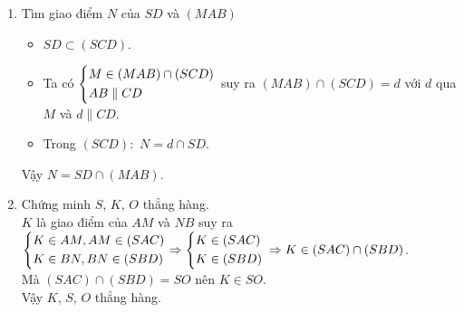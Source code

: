 \begin{bt}
{\begin{enumerate}
\begin{itemize}
					\item $S \in (SDG) \cap (SAB)$.
					\item $SG$ cắt $BC$ tại $E$ trong $(SBC)$ nên mặt phẳng $(SDG)$ cũng chính là mặt phẳng $(SDE)$.
					\item Trong $(ABCD)$ gọi $F= DE \cap AB$, suy ra
					$\heva{&F \in DE, DE \subset (SDG)\\&F \in AB, AB\subset (SAB)}
					\Rightarrow \heva{&F \in (SDG)\\&F \in (SAB)}\\
					\Rightarrow F \in (SDG) \cap (SAB)$.
				\end{itemize}
				Vậy $(SDG)\cap (SAB) =SF$.
			\item Tìm giao điểm $N$ của $SD$ và $(MAB)$
				\begin{itemize}
					\item $SD \subset (SCD)$.
					\item Ta có $\left\{\begin{aligned}&M \in (MAB) \cap (SCD)\\& AB \parallel CD\end{aligned}\right.$ suy ra $(MAB) \cap (SCD) =d$ với $d$ qua $M$ và $d \parallel CD$.\\
					\item Trong $(SCD):$ $N=d \cap SD$.
				\end{itemize}
				Vậy $N=SD \cap (MAB)$.
			\item Chứng minh $S$, $K$, $O$ thẳng hàng.\\
				$K$ là giao điểm của $AM$ và $NB$ suy ra
				$\left\{\begin{aligned}&K \in AM, AM \in (SAC)\\& K \in BN, BN \in (SBD)\end{aligned}\right.
				\Rightarrow \left\{\begin{aligned}&K \in (SAC)\\& K \in (SBD)\end{aligned}\right.\\
				\Rightarrow K \in (SAC)\cap (SBD)$.\\
				Mà $(SAC)\cap (SBD)=SO$ nên $K \in SO$.\\
				Vậy $K$, $S$, $O$ thẳng hàng.
		\end{enumerate}
	}
\end{bt}

